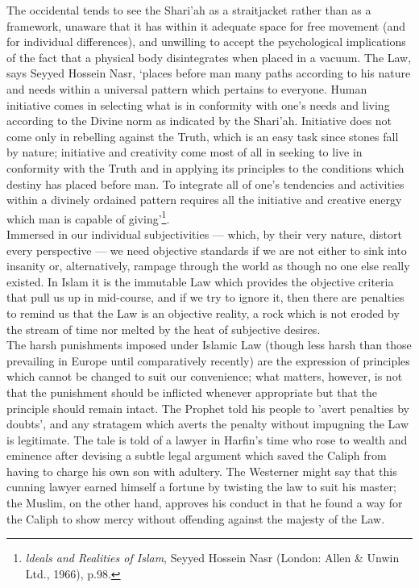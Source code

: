 \documentclass[10pt, twoside]{book}
\begin{document}
The occidental tends to see the Shari'ah as a straitjacket rather than as a framework, unaware that 
it has within it adequate space for free movement (and for individual differences), and unwilling to 
accept the psychological implications of the fact that a physical body disintegrates when placed in a 
vacuum. The Law, says Seyyed Hossein Nasr, `places before man many paths according to his nature and 
needs within a universal pattern which pertains to everyone. Human initiative comes in selecting what 
is in conformity with one's needs and living according to the Divine norm as indicated by the 
Shari'ah. Initiative does not come only in rebelling against the Truth, which is an easy task since 
stones fall by nature; initiative and creativity come most of all in seeking to live in conformity 
with the Truth and in applying its principles to the conditions which destiny has placed before man. 
To integrate all of one's tendencies and activities within a divinely ordained pattern requires all 
the initiative and creative energy which man is capable of giving'\footnote{\emph{ldeals and Realities of Islam}, Seyyed Hossein Nasr (London: Allen \& Unwin Ltd., 1966), p.98.}. \\

Immersed in our individual subjectivities --- which, by their very nature, distort every perspective --- 
we need objective standards if we are not either to sink into insanity or, alternatively, rampage 
through the world as though no one else really existed. In Islam it is the immutable Law which 
provides the objective criteria that pull us up in mid\hyp{}course, and if we try to ignore it, then there 
are penalties to remind us that the Law is an objective reality, a rock which is not eroded by the 
stream of time nor melted by the heat of subjective desires. \\

The harsh punishments imposed under Islamic Law (though less harsh than those prevailing in Europe 
until comparatively recently) are the expression of principles which cannot be changed to suit our 
convenience; what matters, however, is not that the punishment should be inflicted whenever 
appropriate but that the principle should remain intact. The Prophet told his people to 'avert 
penalties by doubts', and any stratagem which averts the penalty without impugning the Law is 
legitimate. The tale is told of a lawyer in Harfin's time who rose to wealth and eminence after 
devising a subtle legal argument which saved the Caliph from having to charge his own son with 
adultery. The Westerner might say that this cunning lawyer earned himself a fortune by twisting the 
law to suit his master; the Muslim, on the other hand, approves his conduct in that he found a way 
for the Caliph to show mercy without offending against the majesty of the Law. \\
\end{document}
